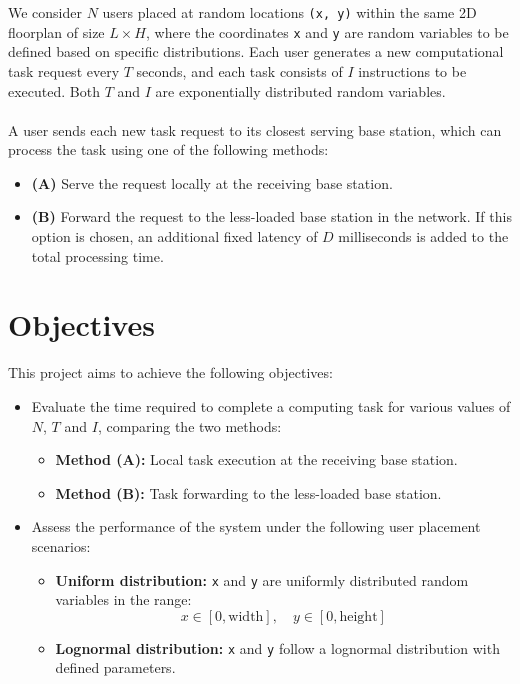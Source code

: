 \documentclass{report}
\begin{document}
We consider $N$ users placed at random locations \texttt{(x, y)} within the same 2D floorplan of size $L \times H$, where the coordinates \texttt{x} and \texttt{y} are random variables to be defined based on specific distributions.
Each user generates a new computational task request every $T$ seconds, and each task consists of $I$ instructions to be executed. Both $T$ and $I$ are exponentially distributed random variables.\\\\
A user sends each new task request to its closest serving base station, which can process the task using one of the following methods:
\begin{itemize}
    \item \textbf{(A)} Serve the request locally at the receiving base station.
    \item \textbf{(B)} Forward the request to the less-loaded base station in the network. If this option is chosen, an additional fixed latency of $D$ milliseconds is added to the total processing time.
\end{itemize}

\section{Objectives}

This project aims to achieve the following objectives:
\begin{itemize}
    \item Evaluate the time required to complete a computing task for various values of $N$, $T$ and $I$, comparing the two methods:
    \begin{itemize}
        \item \textbf{Method (A):} Local task execution at the receiving base station.
        \item \textbf{Method (B):} Task forwarding to the less-loaded base station.
    \end{itemize}
    \item Assess the performance of the system under the following user placement scenarios:
    \begin{itemize}
        \item \textbf{Uniform distribution:} \texttt{x} and \texttt{y} are uniformly distributed random variables in the range:
        \[
        x \in [0, \text{width}], \quad y \in [0, \text{height}]
        \]
        \item \textbf{Lognormal distribution:} \texttt{x} and \texttt{y} follow a lognormal distribution with defined parameters.
    \end{itemize}
\end{itemize}
\end{document}
